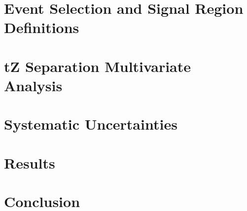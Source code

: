 \documentclass[12pt]{report}	%
\theoremstyle{definition}
\theoremstyle{remark}
\begin{document}
\section{Event Selection and Signal Region Definitions}
\label{sec:evt_selection}

 
\section{tZ Separation Multivariate Analysis}
\label{sec:tZ_bdt}


\section{Systematic Uncertainties}
\label{sec:sys}
                                                                              
                                                                                                                             
\section{Results}
\label{sec:results}                                                                                                          


\section{Conclusion}
\label{sec:conclusion}
\end{document}
